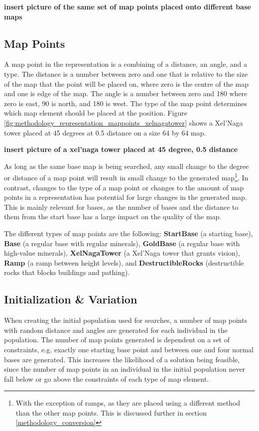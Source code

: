 \textbf{insert picture of the same set of map points placed onto different base maps}

\subsection{Map Points}
\label{methodology_representation_mappoints}
A map point in the representation is a combining of a distance, an angle, and a type. The distance is a number between zero and one that is relative to the size of the map that the point will be placed on, where zero is the centre of the map and one is edge of the map. The angle is a number between zero and 180 where zero is east, 90 is north, and 180 is west. The type of the map point determines which map element should be placed at the position. Figure \ref{fig:methodology_representation_mappoints_xelnagatower} shows a Xel'Naga tower placed at 45 degrees at 0.5 distance on a size 64 by 64 map.

\textbf{insert picture of a xel'naga tower placed at 45 degree, 0.5 distance}

As long as the same base map is being searched, any small change to the degree or distance of a map point will result in small change to the generated map\footnote{With the exception of ramps, as they are placed using a different method than the other map points. This is discussed further in section \ref{methodology_conversion}}. In contrast, changes to the type of a map point or changes to the amount of map points in a representation has potential for large changes in the generated map. This is mainly relevant for bases, as the number of bases and the distance to them from the start base has a large impact on the quality of the map.

The different types of map points are the following: \textbf{StartBase} (a starting base), \textbf{Base} (a regular base with regular minerals), \textbf{GoldBase} (a regular base with high-value minerals), \textbf{XelNagaTower} (a Xel'Naga tower that grants vision), \textbf{Ramp} (a ramp between height levels), and \textbf{DestructibleRocks} (destructible rocks that blocks buildings and pathing).

\subsection{Initialization \& Variation}
\label{methodology_representation_initialization}
When creating the initial population used for searches, a number of map points with random distance and angles are generated for each individual in the population. The number of map points generated is dependent on a set of constraints, e.g. exactly one starting base point and between one and four normal bases are generated. This increases the likelihood of a solution being feasible, since the number of map points in an individual in the initial population never fall below or go above the constraints of each type of map element.

